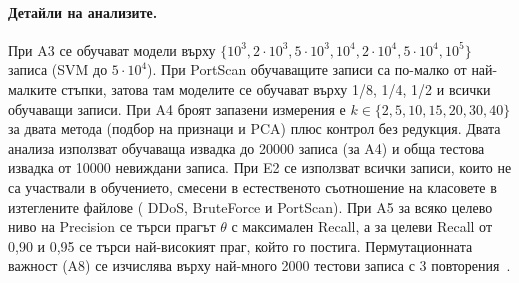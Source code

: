 \paragraph{Детайли на анализите.} При A3 се обучават модели върху $\{10^3, 2\cdot10^3, 5\cdot10^3, 10^4, 2\cdot10^4, 5\cdot10^4, 10^5\}$ записа (SVM до $5\cdot10^4$). При PortScan обучаващите записи са по-малко от най-малките стъпки, затова там моделите се обучават върху 1/8, 1/4, 1/2 и всички обучаващи записи. При A4 броят запазени измерения е $k\in\{2,5,10,15,20,30,40\}$ за двата метода (подбор на признаци и PCA) плюс контрол без редукция. Двата анализа използват обучаваща извадка до \num{20000} записа (за A4) и обща тестова извадка от \num{10000} невиждани записа. При E2 се използват всички записи, които не са участвали в обучението, смесени в естественото съотношение на класовете в изтеглените файлове ( DDoS,  BruteForce и  PortScan). При A5 за всяко целево ниво на Precision се търси прагът $\theta$ с максимален Recall, а за целеви Recall от 0,90 и 0,95 се търси най-високият праг, който го постига. Пермутационната важност (A8) се изчислява върху най-много \num{2000} тестови записа с 3 повторения~\cite{fisher2019}.
